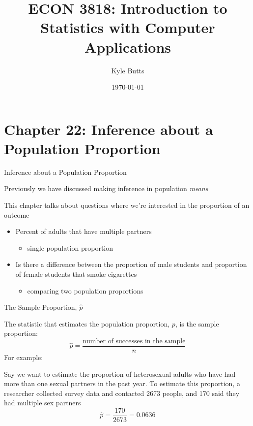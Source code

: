 \documentclass{beamer}
\title{ECON 3818: Introduction to Statistics with Computer Applications}
\date{\today}
\author{Kyle Butts}
\begin{document}
\maketitle

\section{Chapter 22: Inference about a Population Proportion}

\begin{frame}{Inference about a Population Proportion}
	
	Previously we have discussed making inference in population \textit{means}
	
	This chapter talks about questions where we're interested in the proportion of an outcome 
	\begin{itemize}
		\item Percent of adults that have multiple partners
			\begin{itemize}
				\item single population proportion
			\end{itemize}
		      
		\item Is there a difference between the proportion of male students and proportion of female students that smoke cigarettes
			\begin{itemize}
				\item comparing two population proportions
			\end{itemize}
	\end{itemize}
	
\end{frame}


\begin{frame}{The Sample Proportion, $\hat{p}$}
	
	The statistic that estimates the population proportion, $p$, is the \alert{sample proportion}:
	\[
		\hat{p}=\frac{\text{number of successes in the sample}}{n}
	\]
	For example: 
	
	Say we want to estimate the proportion of heterosexual adults who have had more than one sexual partners in the past year. To estimate this proportion, a researcher collected survey data and contacted 2673 people, and 170 said they had multiple sex partners
	\[
		\hat{p}=\frac{170}{2673}=0.0636
	\]
	
\end{frame}
\end{document}

